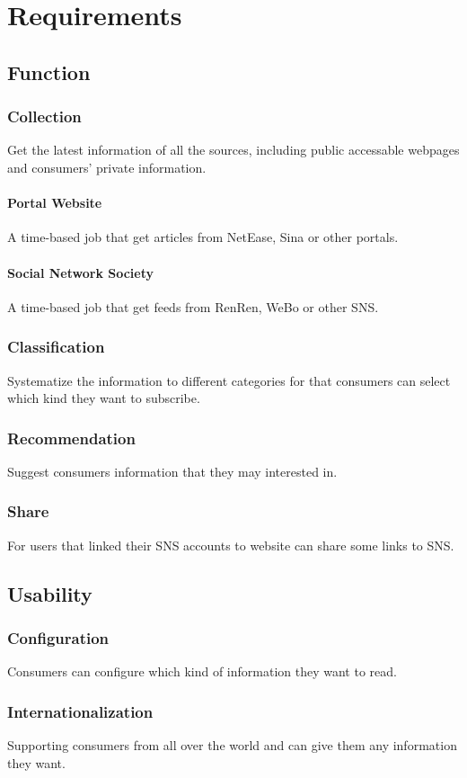 \section{Requirements}
  \subsection{Function}
    \subsubsection{Collection}
      Get the latest information of all the sources, including public accessable webpages and consumers' private information.
      \paragraph{Portal Website}
        A time-based job that get articles from NetEase, Sina or other portals.
      \paragraph{Social Network Society}
        A time-based job that get feeds from RenRen, WeBo or other SNS.
    \subsubsection{Classification}
      Systematize the information to different categories for that consumers can select which kind they want to subscribe.
    \subsubsection{Recommendation}
      Suggest consumers information that they may interested in.
    \subsubsection{Share}
      For users that linked their SNS accounts to website can share some links to SNS.
  \subsection{Usability}
    \subsubsection{Configuration}
      Consumers can configure which kind of information they want to read.
    \subsubsection{Internationalization}
      Supporting consumers from all over the world and can give them any information they want.
